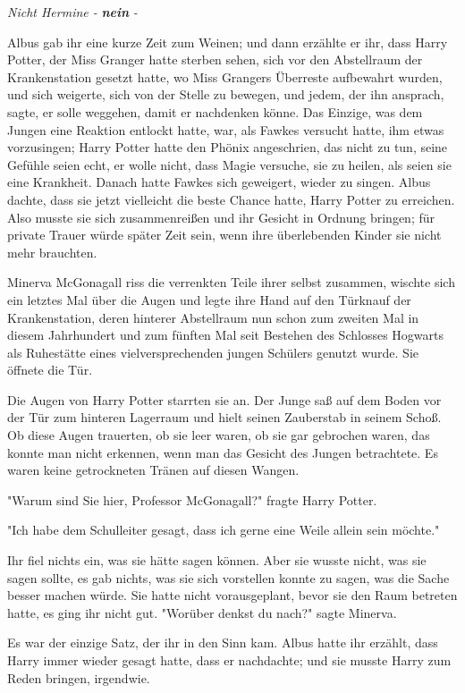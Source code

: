 {\emph{Nicht Hermine -} \textbf{\emph{nein}} \emph{-}

Albus gab ihr eine kurze Zeit zum Weinen; und dann erzählte er ihr, dass Harry Potter, der Miss Granger hatte sterben sehen, sich vor den Abstellraum der Krankenstation gesetzt hatte, wo Miss Grangers Überreste aufbewahrt wurden, und sich weigerte, sich von der Stelle zu bewegen, und jedem, der ihn ansprach, sagte, er solle weggehen, damit er nachdenken könne. Das Einzige, was dem Jungen eine Reaktion entlockt hatte, war, als Fawkes versucht hatte, ihm etwas vorzusingen; Harry Potter hatte den Phönix angeschrien, das nicht zu tun, seine Gefühle seien echt, er wolle nicht, dass Magie versuche, sie zu heilen, als seien sie eine Krankheit. Danach hatte Fawkes sich geweigert, wieder zu singen. Albus dachte, dass sie jetzt vielleicht die beste Chance hatte, Harry Potter zu erreichen. Also musste sie sich zusammenreißen und ihr Gesicht in Ordnung bringen; für private Trauer würde später Zeit sein, wenn ihre überlebenden Kinder sie nicht mehr brauchten.

Minerva McGonagall riss die verrenkten Teile ihrer selbst zusammen, wischte sich ein letztes Mal über die Augen und legte ihre Hand auf den Türknauf der Krankenstation, deren hinterer Abstellraum nun schon zum zweiten Mal in diesem Jahrhundert und zum fünften Mal seit Bestehen des Schlosses Hogwarts als Ruhestätte eines vielversprechenden jungen Schülers genutzt wurde. Sie öffnete die Tür.

Die Augen von Harry Potter starrten sie an. Der Junge saß auf dem Boden vor der Tür zum hinteren Lagerraum und hielt seinen Zauberstab in seinem Schoß. Ob diese Augen trauerten, ob sie leer waren, ob sie gar gebrochen waren, das konnte man nicht erkennen, wenn man das Gesicht des Jungen betrachtete. Es waren keine getrockneten Tränen auf diesen Wangen.

"Warum sind Sie hier, Professor McGonagall?" fragte Harry Potter.

"Ich habe dem Schulleiter gesagt, dass ich gerne eine Weile allein sein möchte."

Ihr fiel nichts ein, was sie hätte sagen können. Aber sie wusste nicht, was sie sagen sollte, es gab nichts, was sie sich vorstellen konnte zu sagen, was die Sache besser machen würde. Sie hatte nicht vorausgeplant, bevor sie den Raum betreten hatte, es ging ihr nicht gut. "Worüber denkst du nach?" sagte Minerva.

Es war der einzige Satz, der ihr in den Sinn kam. Albus hatte ihr erzählt, dass Harry immer wieder gesagt hatte, dass er nachdachte; und sie musste Harry zum Reden bringen, irgendwie.

}
